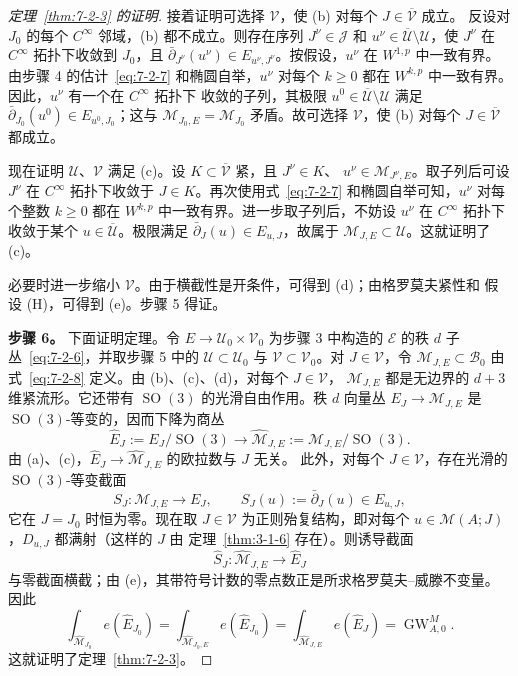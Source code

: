 \begin{proof}[定理~\ref{thm:7-2-3} 的证明]
接着证明可选择 $\mathcal V$，使 (b) 对每个 $J\in\overline{\mathcal V}$ 成立。
反设对 $J_0$ 的每个 $C^\infty$ 邻域，(b) 都不成立。则存在序列
$J^\nu\in\mathcal J$ 和 $u^\nu\in\overline{\mathcal U}\setminus\mathcal U$，使
$J^\nu$ 在 $C^\infty$ 拓扑下收敛到 $J_0$，且
$\bar\partial_{J^\nu}(u^\nu)\in E_{u^\nu,J^\nu}$。按假设，$u^\nu$ 在
$W^{1,p}$ 中一致有界。由步骤 4 的估计~\eqref{eq:7-2-7} 和椭圆自举，$u^\nu$ 对每个
$k\geq0$ 都在 $W^{k,p}$ 中一致有界。因此，$u^\nu$ 有一个在 $C^\infty$ 拓扑下
收敛的子列，其极限 $u^0\in\overline{\mathcal U}\setminus\mathcal U$ 满足
$\bar\partial_{J_0}(u^0)\in E_{u^0,J_0}$；这与
$\mathcal M_{J_0,E}=\mathcal M_{J_0}$ 矛盾。故可选择 $\mathcal V$，使 (b) 对每个
$J\in\overline{\mathcal V}$ 都成立。

现在证明 $\mathcal U$、$\mathcal V$ 满足 (c)。设
$K\subset\overline{\mathcal V}$ 紧，且 $J^\nu\in K$、
$u^\nu\in\mathcal M_{J^\nu,E}$。取子列后可设 $J^\nu$ 在 $C^\infty$ 拓扑下收敛于
$J\in K$。再次使用式~\eqref{eq:7-2-7} 和椭圆自举可知，$u^\nu$ 对每个整数
$k\geq0$ 都在 $W^{k,p}$ 中一致有界。进一步取子列后，不妨设 $u^\nu$ 在
$C^\infty$ 拓扑下收敛于某个 $u\in\overline{\mathcal U}$。极限满足
$\bar\partial_J(u)\in E_{u,J}$，故属于
$\mathcal M_{J,E}\subset\mathcal U$。这就证明了 (c)。

必要时进一步缩小 $\mathcal V$。由于横截性是开条件，可得到 (d)；由格罗莫夫紧性和
假设 (H)，可得到 (e)。步骤 5 得证。

\medskip
\noindent\textbf{步骤 6。}\quad
下面证明定理。令 $E\to\mathcal U_0\times\mathcal V_0$ 为步骤 3 中构造的
$\mathcal E$ 的秩 $d$ 子丛~\eqref{eq:7-2-6}，并取步骤 5 中的
$\mathcal U\subset\mathcal U_0$ 与 $\mathcal V\subset\mathcal V_0$。对
$J\in\mathcal V$，令 $\mathcal M_{J,E}\subset\mathcal B_0$ 由
式~\eqref{eq:7-2-8} 定义。由 (b)、(c)、(d)，对每个 $J\in\mathcal V$，
$\mathcal M_{J,E}$ 都是无边界的 $d+3$ 维紧流形。它还带有
$\operatorname{SO}(3)$ 的光滑自由作用。秩 $d$ 向量丛
$E_J\to\mathcal M_{J,E}$ 是 $\operatorname{SO}(3)$-等变的，因而下降为商丛
\[
  \widehat E_J:=E_J/\operatorname{SO}(3)
  \longrightarrow
  \widehat{\mathcal M}_{J,E}:=
  \mathcal M_{J,E}/\operatorname{SO}(3).
\]
由 (a)、(c)，$\widehat E_J\to\widehat{\mathcal M}_{J,E}$ 的欧拉数与 $J$ 无关。
此外，对每个 $J\in\mathcal V$，存在光滑的 $\operatorname{SO}(3)$-等变截面
\[
  S_J:\mathcal M_{J,E}\longrightarrow E_J,
  \qquad S_J(u):=\bar\partial_J(u)\in E_{u,J},
\]
它在 $J=J_0$ 时恒为零。现在取 $J\in\mathcal V$ 为正则殆复结构，即对每个
$u\in\mathcal M(A;J)$，$D_{u,J}$ 都满射（这样的 $J$ 由
定理~\ref{thm:3-1-6} 存在）。则诱导截面
\[
  \widehat S_J:\widehat{\mathcal M}_{J,E}\longrightarrow\widehat E_J
\]
与零截面横截；由 (e)，其带符号计数的零点数正是所求格罗莫夫--威滕不变量。因此
\[
  \int_{\widehat{\mathcal M}_{J_0}}e(\widehat E_{J_0})
  =\int_{\widehat{\mathcal M}_{J_0,E}}e(\widehat E_{J_0})
  =\int_{\widehat{\mathcal M}_{J,E}}e(\widehat E_J)
  =\operatorname{GW}^{M}_{A,0}.
\]
这就证明了定理~\ref{thm:7-2-3}。
\end{proof}

